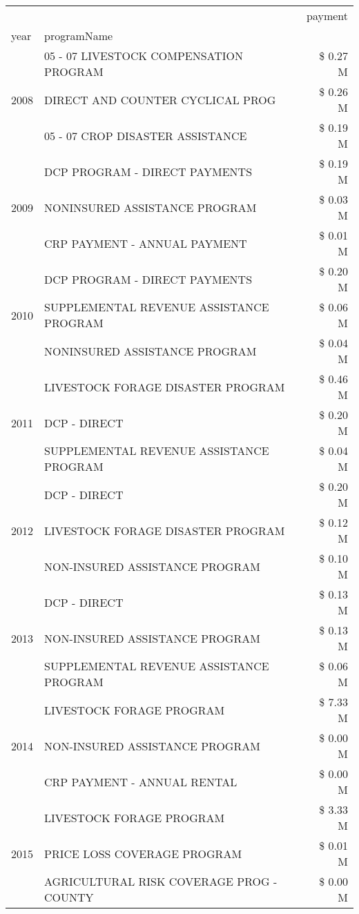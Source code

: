 \begin{tabular}{llr}
\toprule
 &  & payment \\
year & programName &  \\
\midrule
\multirow[t]{3}{*}{2008} & 05 - 07 LIVESTOCK COMPENSATION PROGRAM & \$ 0.27 M \\
 & DIRECT AND COUNTER CYCLICAL PROG & \$ 0.26 M \\
 & 05 - 07 CROP DISASTER ASSISTANCE & \$ 0.19 M \\
\cline{1-3}
\multirow[t]{3}{*}{2009} & DCP PROGRAM - DIRECT PAYMENTS & \$ 0.19 M \\
 & NONINSURED ASSISTANCE PROGRAM & \$ 0.03 M \\
 & CRP PAYMENT - ANNUAL PAYMENT & \$ 0.01 M \\
\cline{1-3}
\multirow[t]{3}{*}{2010} & DCP PROGRAM - DIRECT PAYMENTS & \$ 0.20 M \\
 & SUPPLEMENTAL REVENUE ASSISTANCE PROGRAM & \$ 0.06 M \\
 & NONINSURED ASSISTANCE PROGRAM & \$ 0.04 M \\
\cline{1-3}
\multirow[t]{3}{*}{2011} & LIVESTOCK FORAGE DISASTER PROGRAM & \$ 0.46 M \\
 & DCP - DIRECT & \$ 0.20 M \\
 & SUPPLEMENTAL REVENUE ASSISTANCE PROGRAM & \$ 0.04 M \\
\cline{1-3}
\multirow[t]{3}{*}{2012} & DCP - DIRECT & \$ 0.20 M \\
 & LIVESTOCK FORAGE DISASTER PROGRAM & \$ 0.12 M \\
 & NON-INSURED ASSISTANCE PROGRAM & \$ 0.10 M \\
\cline{1-3}
\multirow[t]{3}{*}{2013} & DCP - DIRECT & \$ 0.13 M \\
 & NON-INSURED ASSISTANCE PROGRAM & \$ 0.13 M \\
 & SUPPLEMENTAL REVENUE ASSISTANCE PROGRAM & \$ 0.06 M \\
\cline{1-3}
\multirow[t]{3}{*}{2014} & LIVESTOCK FORAGE PROGRAM & \$ 7.33 M \\
 & NON-INSURED ASSISTANCE PROGRAM & \$ 0.00 M \\
 & CRP PAYMENT - ANNUAL RENTAL & \$ 0.00 M \\
\cline{1-3}
\multirow[t]{3}{*}{2015} & LIVESTOCK FORAGE PROGRAM & \$ 3.33 M \\
 & PRICE LOSS COVERAGE PROGRAM & \$ 0.01 M \\
 & AGRICULTURAL RISK COVERAGE PROG - COUNTY & \$ 0.00 M \\
\cline{1-3}

\end{tabular}
